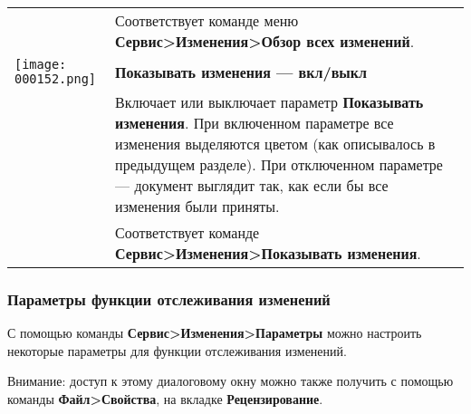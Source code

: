 ﻿\documentclass[a4paper,10pt]{article}
\begin{document}
\begin{center}
\begin{longtable}{  m{2cm}  m{14cm}  }
& Соответствует команде меню \textbf{Сервис>Изменения>Обзор всех изменений}.\\
\texttt{[image: 000152.png]} & \textbf{Показывать изменения — вкл/выкл}\\
& Включает или выключает параметр \textbf{Показывать изменения}. При включенном параметре все изменения выделяются цветом (как описывалось в предыдущем разделе). При отключенном параметре — документ выглядит так, как если бы все изменения были приняты.\\
& Соответствует команде \textbf{Сервис>Изменения>Показывать изменения}.\\
\end{longtable} 
\end{center}

\subsubsection{Параметры функции отслеживания изменений}
С помощью команды \textbf{Сервис>Изменения>Параметры} можно настроить некоторые параметры для функции отслеживания изменений.

Внимание: доступ к этому диалоговому окну можно также получить с помощью команды \textbf{Файл>Свойства}, на вкладке \textbf{Рецензирование}.
\end{document}
